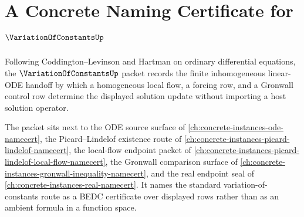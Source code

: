 \chapter{A Concrete Naming Certificate for $\VariationOfConstantsUp$}
\label{ch:concrete-instances-variation-of-constants-namecert}

Following Coddington--Levinson and Hartman on ordinary differential equations, the $\VariationOfConstantsUp$ packet records the finite inhomogeneous linear-ODE handoff by which a homogeneous local flow, a forcing row, and a Gronwall control row determine the displayed solution update without importing a host solution operator.

The packet sits next to the ODE source surface of \autoref{ch:concrete-instances-ode-namecert}, the Picard--Lindelof existence route of \autoref{ch:concrete-instances-picard-lindelof-namecert}, the local-flow endpoint packet of \autoref{ch:concrete-instances-picard-lindelof-local-flow-namecert}, the Gronwall comparison surface of \autoref{ch:concrete-instances-gronwall-inequality-namecert}, and the real endpoint seal of \autoref{ch:concrete-instances-real-namecert}. It names the standard variation-of-constants route as a BEDC certificate over displayed rows rather than as an ambient formula in a function space.

